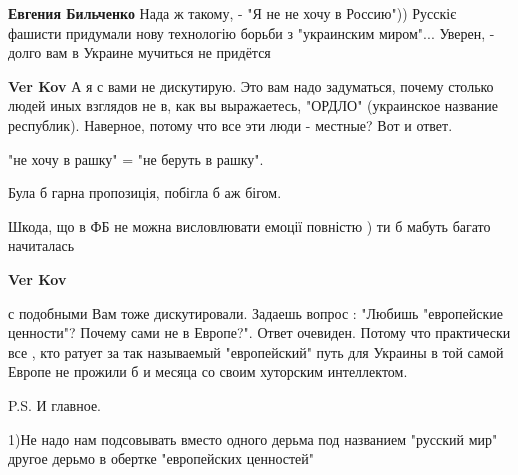 \begin{itemize}
\begin{itemize}
 
\textbf{Евгения Бильченко} Нада ж такому, - "Я не не хочу в Россию")) Русскіє
фашисти придумали нову технологію борьби з "украинским миром"... Уверен, -
долго вам в Украине мучиться не придётся

 
\textbf{Ver Kov} А я с вами не дискутирую. Это вам надо задуматься, почему столько людей иных взглядов не в, как вы выражаетесь, "ОРДЛО" (украинское название республик). Наверное, потому что все эти люди - местные? Вот и ответ.

 

"не хочу в рашку" = "не беруть в рашку".

Була б гарна пропозиція, побігла б аж бігом.

Шкода, що в ФБ не можна висловлювати емоції повністю ) ти б мабуть багато
начиталась

 
\textbf{Ver Kov} 

с подобными Вам тоже дискутировали. Задаешь вопрос : "Любишь "европейские
ценности"? Почему сами не в Европе?". Ответ очевиден. Потому что практически
все , кто ратует за так называемый "европейский" путь для Украины в той самой
Европе не прожили б и месяца со своим хуторским интеллектом.

P.S. И главное.

1)Не надо нам подсовывать вместо одного дерьма под названием "русский мир" другое дерьмо в обертке "европейских ценностей"


\end{itemize}
\end{itemize}
